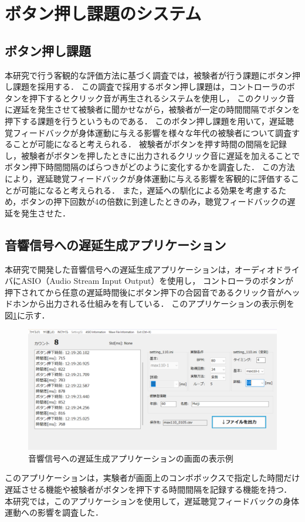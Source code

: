 \section{ボタン押し課題のシステム}
\subsection{ボタン押し課題}
本研究で行う客観的な評価方法に基づく調査では，被験者が行う課題にボタン押し課題を採用する．
この調査で採用するボタン押し課題は，コントローラのボタンを押下するとクリック音が再生されるシステムを使用し，
このクリック音に遅延を発生させて被験者に聞かせながら，被験者が一定の時間間隔でボタンを押下する課題を行うというものである．
このボタン押し課題を用いて，遅延聴覚フィードバックが身体運動に与える影響を様々な年代の被験者について調査することが可能になると考えられる．
被験者がボタンを押す時間の間隔を記録し，被験者がボタンを押したときに出力されるクリック音に遅延を加えることでボタン押下時間間隔のばらつきがどのように変化するかを調査した．
この方法により，遅延聴覚フィードバックが身体運動に与える影響を客観的に評価することが可能になると考えられる．
また，遅延への馴化による効果を考慮するため，ボタンの押下回数が4の倍数に到達したときのみ，聴覚フィードバックの遅延を発生させた．
\subsection{音響信号への遅延生成アプリケーション}
本研究で開発した音響信号への遅延生成アプリケーションは，オーディオドライバにASIO（Audio Stream Input Output）を使用し，
コントローラのボタンが押下されてから任意の遅延時間後にボタン押下の合図音であるクリック音がヘッドホンから出力される仕組みを有している．
このアプリケーションの表示例を図\ref{fig:app_kyakkann}に示す．
\begin{figure}[tbp]
  \centering
  \includegraphics[scale=0.22]{figures/Apprication/App_kyakkann.pdf}
  \caption{音響信号への遅延生成アプリケーションの画面の表示例}
  \label{fig:app_kyakkann}
\end{figure}
このアプリケーションは，実験者が画面上のコンボボックスで指定した時間だけ遅延させる機能や被験者がボタンを押下する時間間隔を記録する機能を持つ．
本研究では，このアプリケーションを使用して，遅延聴覚フィードバックの身体運動への影響を調査した．